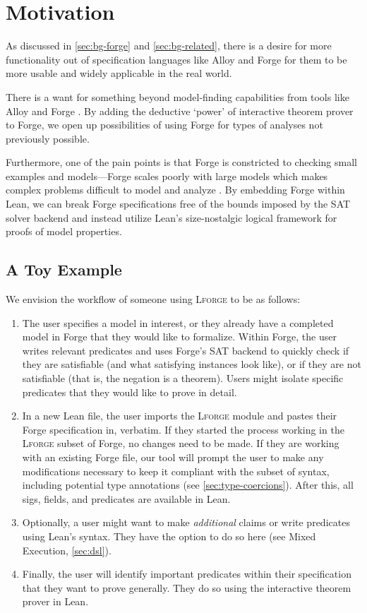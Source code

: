 \section{Motivation}

As discussed in \cref{sec:bg-forge} and \cref{sec:bg-related}, there is a desire for more functionality out of specification languages like Alloy and Forge for them to be more usable and widely applicable in the real world. 

There is a want for something beyond model-finding capabilities from tools like Alloy and Forge \cite{milicevic2014alpha}. By adding the deductive `power' of interactive theorem prover to Forge, we open up possibilities of using Forge for types of analyses not previously possible. 

Furthermore, one of the pain points is that Forge is constricted to checking small examples and models---Forge scales poorly with large models which makes complex problems difficult to model and analyze \cite{lzhu-honorsthesis}. By embedding Forge within Lean, we can break Forge specifications free of the bounds imposed by the SAT solver backend and instead utilize Lean's size-nostalgic logical framework for proofs of model properties. 

\subsection{A Toy Example}\label{sec:toy-example}

We envision the workflow of someone using \textsc{Lforge} to be as follows: 
\begin{enumerate}
    \item The user specifies a model in interest, or they already have a completed model in Forge that they would like to formalize. Within Forge, the user writes relevant predicates and uses Forge's SAT backend to quickly check if they are satisfiable (and what satisfying instances look like), or if they are not satisfiable (that is, the negation is a theorem). Users might isolate specific predicates that they would like to prove in detail. 
    \item In a new Lean file, the user imports the \textsc{Lforge} module and pastes their Forge specification in, verbatim. If they started the process working in the \textsc{Lforge} subset of Forge, no changes need to be made. If they are working with an existing Forge file, our tool will prompt the user to make any modifications necessary to keep it compliant with the subset of syntax, including potential type annotations (see \cref{sec:type-coercions}). After this, all sigs, fields, and predicates are available in Lean. 
    \item Optionally, a user might want to make \emph{additional} claims or write predicates using Lean's syntax. They have the option to do so here (see Mixed Execution, \cref{sec:dsl}). 
    \item Finally, the user will identify important predicates within their specification that they want to prove generally. They do so using the interactive theorem prover in Lean. 
\end{enumerate}

